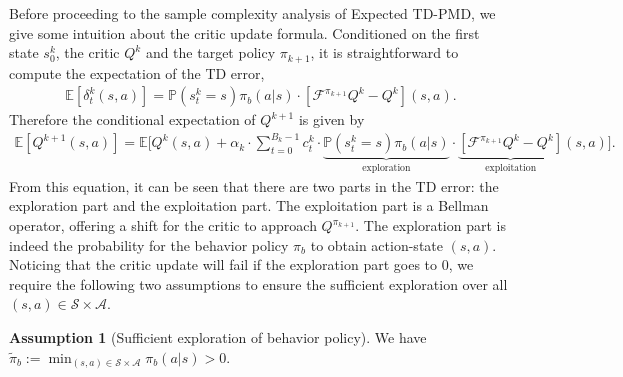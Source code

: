 \documentclass[10pt]{article}
\newcommand{\calA}{\mathcal{A}}
\newcommand{\calS}{\mathcal{S}}
\newcommand{\calF}{\mathcal{F}}
\newcommand{\E}{\mathbb{E}}
\renewcommand{\P}{\mathbb{P}}
\newcommand{\ls}{\left}
\newcommand{\rs}{\right}
\theoremstyle{plain}
\theoremstyle{definition}
\newtheorem{assumption}[theorem]{Assumption}
\begin{document}
Before proceeding to the sample complexity analysis of Expected TD-PMD, we give some intuition about the critic update formula. Conditioned on the first state $s_0^k$, the critic $Q^k$ and the target policy $\pi_{k+1}$, it is straightforward to compute the expectation of the TD error,
\begin{align*}
    \E\ls[ \delta_t^k(s,a) \rs] = \P\ls( s_t^k=s \rs) \pi_b(a|s) \cdot \ls[ \calF^{\pi_{k+1}} Q^k - Q^k \rs](s,a).
\end{align*}
Therefore the conditional expectation of $Q^{k+1}$ is given by
\begin{align}
    \E\ls[ Q^{k+1}(s,a) \rs] = \E\Bigg[ Q^k(s,a) + \alpha_k\cdot\sum_{t=0}^{B_k-1} c_t^k\cdot \underbrace{\P(s_t^k=s) \pi_b(a|s)}_{\mbox{exploration}} \cdot \underbrace{\ls[ \calF^{\pi_{k+1}} Q^k - Q^k \rs]}_{\mbox{exploitation}}(s,a) \Bigg].
    \label{eq:Expected-TD-AC-PMD:intuition}
\end{align}
From this equation, it can be seen that there are two parts in the TD error: the exploration part and the exploitation part. The exploitation part is a Bellman operator, offering a shift for the critic to approach $Q^{\pi_{k+1}}$. The exploration part is indeed the probability for the behavior policy $\pi_b$ to obtain action-state $(s,a)$. Noticing that the critic update will fail if the exploration part goes to $0$, we require the following two assumptions to ensure the sufficient  exploration over all $(s,a) \in \calS\times\calA$.

\begin{assumption}[Sufficient exploration of behavior policy]
    We have $\tilde\pi_b := \min_{(s,a) \in \calS\times\calA} \pi_b(a|s) > 0$.
    \label{ass:behavior-exploration}
\end{assumption}
\end{document}
